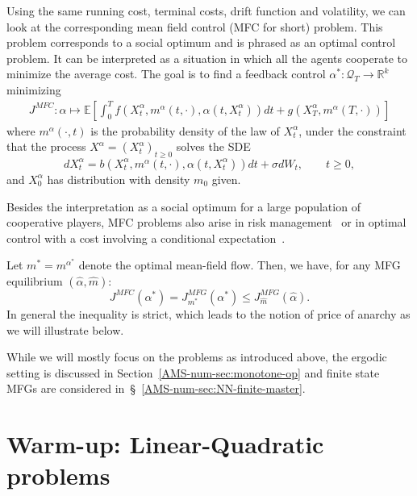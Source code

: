 \documentclass{amsproc}
\theoremstyle{definition}
\theoremstyle{remark}
\numberwithin{equation}{section}
\newcommand{\EE}{{\mathbb E}}
\newcommand{\RR}{{\mathbb R}}
\newcommand{\ctrl}{\alpha}
\newcommand{\ctrldim}{k}
\newcommand{\domT}{\mathcal{Q}_{T}}
\begin{document}
Using the same running cost, terminal costs, drift function and volatility, we can look at the corresponding mean field control (MFC for short) problem. This problem corresponds to a social optimum and is phrased as an optimal control problem. It can be interpreted as a situation in which all the agents cooperate to minimize the average cost. The goal is to find a feedback control $\ctrl^*: \domT\to \RR^\ctrldim$ minimizing
\begin{align}
\label{AMS-num-eq:def-J-MFC}
	J^{MFC}: \ctrl \mapsto \EE \left[\int_0^T f(X_t^{\ctrl}, m^{\ctrl}(t,\cdot), \ctrl(t,X_t^{\ctrl}) ) dt + g(X_T^{\ctrl}, m^{\ctrl}(T,\cdot)) \right]
\end{align}
where $m^{\ctrl}(\cdot, t)$ is the probability density of the law of $X_t^{\ctrl}$, under the constraint that the process $X^{\ctrl} = (X_t^{\ctrl})_{t \ge 0}$ solves the SDE
\begin{equation}
\label{AMS-num-eq:dyn-X-general-MFC}
	d X_t^{\ctrl} = b(X_t^{\ctrl}, m^{\ctrl}(t,\cdot), \ctrl(t, X_t^{\ctrl})) dt + \sigma d W_t, \qquad t \ge 0,
\end{equation}
and $X_0^{\ctrl}$ has distribution with density $m_0$ given. 

Besides the interpretation as a social optimum for a large population of cooperative players, MFC problems also arise in risk management~\cite{MR2784835} or in optimal control with a cost involving a conditional expectation~\cite{MR4133380,achdoulaurierelions2020optimal}.

Let $m^* = m^{\ctrl^*}$ denote the optimal mean-field flow. Then, we have, for any MFG equilibrium $(\hat\ctrl, \hat m )$:
$$
	J^{MFC}(\ctrl^*) = J^{MFG}_{m^*}(\ctrl^*) \leq J^{MFG}_{\hat{m}}(\hat{\ctrl}).
$$
In general the inequality is strict, which leads to the notion of price of anarchy as we will illustrate below.

While we will mostly focus on the problems as introduced above, the ergodic setting is discussed in Section~\ref{AMS-num-sec:monotone-op} and finite state MFGs are considered in~\S~\ref{AMS-num-sec:NN-finite-master}. 






\clearpage




\section{\bf Warm-up: Linear-Quadratic problems}
\label{AMS-num-sec:LQ}
\end{document}
